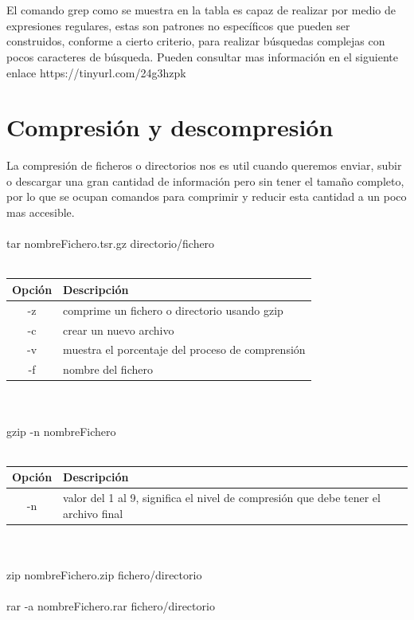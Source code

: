 \documentclass[10pt,a4paper,titlepage]{article}
\begin{document}
	\\
	\\
	El comando grep como se muestra en la tabla es capaz de realizar por medio de expresiones regulares, estas son patrones no específicos que pueden ser construidos, conforme a cierto criterio, para realizar búsquedas complejas con pocos caracteres de búsqueda. Pueden consultar mas información en el siguiente enlace https://tinyurl.com/24g3hzpk

	\section*{Compresión y descompresión}
	La compresión de ficheros o directorios nos es util cuando queremos enviar, subir o descargar una gran cantidad de información pero sin tener el tamaño completo, por lo que se ocupan comandos para comprimir y reducir esta cantidad a un poco mas accesible.
	\\
	\\
	tar nombreFichero.tsr.gz directorio/fichero
	\\
	\\
	\begin{tabular}{|c|p{8cm}|}
		\hline
		Opción & Descripción \\
		\hline
		-z & comprime un fichero o directorio usando gzip \\
		\hline
		-c & crear un nuevo archivo \\
		\hline
		-v & muestra el porcentaje del proceso de comprensión \\
		\hline
		-f & nombre del fichero \\
		\hline
	\end{tabular}
	\\
	\\
	gzip -n nombreFichero
	\\
	\\
	\begin{tabular}{|c|p{8cm}|}
		\hline
		Opción & Descripción \\
		\hline
		-n & valor del 1 al 9, significa el nivel de compresión que debe tener el archivo final \\
		\hline
	\end{tabular}
	\\
	\\
	zip nombreFichero.zip fichero/directorio
	\\
	\\
	rar -a nombreFichero.rar fichero/directorio
	\\
	\\	
	
\end{document}
